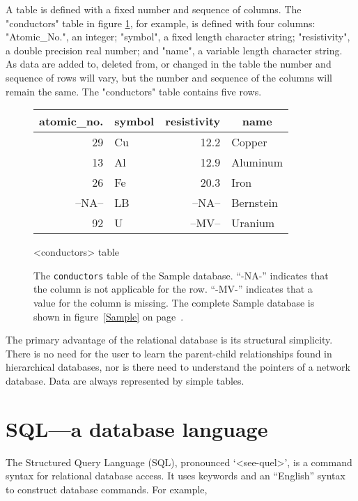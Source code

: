 A table is defined with a fixed number and sequence
of columns.  The "conductors" table in
figure \ref{Sample-conductor}, for example,
is defined with four columns: "Atomic_No.", an integer;
"symbol", a fixed length character string;
"resistivity", a double precision real number;
and "name", a variable length character string.
As data are added to, deleted from, or changed in the
table the number and sequence of rows will vary, but
the number and sequence of the columns will remain the same.
The "conductors" table contains five rows.
 
\begin{figure}[htp]
\begin{center}
  \begin{tabular}[t]{|r|l|r|l|}
     \hline
     \multicolumn{1}{|c|}{atomic_no.}&
     \multicolumn{1}{|c|}{symbol}&
     \multicolumn{1}{|c|}{resistivity}&
     \multicolumn{1}{|c|}{name}\\
     \hline
    29& Cu& 12.2  & Copper\\
    13& Al& 12.9  & Aluminum\\
    26& Fe& 20.3  & Iron\\
--NA--& LB&--NA--& Bernstein\\
    92& U &--MV--  & Uranium\\
     \hline
  \end{tabular}
    \par  {<conductors> table }
  \end{center}
\smallskip
\caption[{\tt conductors} table of the Sample database]
    {The {\tt conductors} table of the Sample database.
    ``-NA-'' indicates that the column is not applicable for
    the row.
    ``-MV-'' indicates that a value for the column is missing.
    The complete Sample database is shown in figure~\ref{Sample}
    on page~\pageref{Sample}.}
   \label{Sample-conductor}
\end{figure}
 
 
The primary advantage of the relational database is its
structural simplicity.  There is no need for the user to
learn the parent-child relationships found in hierarchical
databases, nor is there need to understand the pointers
of a network database.
Data are always represented by simple tables.
 
 
 
 
 
 
 
\section{SQL---a database language}
The Structured Query Language (SQL), pronounced `<see-quel\/>',
is a command syntax for relational
database access.  It uses keywords and an ``English'' syntax
to construct database commands.  For example,
 
